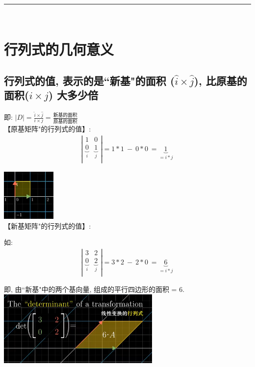 \documentclass[UTF8]{ctexart}
\begin{document}
	
~\\
\hrule
~\\

\section{行列式的几何意义}

\subsection{行列式的值, 表示的是``新基"的面积 ($ \hat{i} × \hat{j}$), 比原基的面积($ i × j$) 大多少倍}

即:
$
\boxed{
	|D| = \frac{ \hat{i} × \hat{j}}{ i × j}
	= \frac{\text{新基的面积}}{\text{原基的面积}}
}$\\


【原基矩阵"的行列式的值】: \\
\begin{align*}
\left| \begin{array}{c|c}
	1&		0\\
	\underset{i}{\underbrace{0}}&		\underset{j}{\underbrace{1}}\\
\end{array} \right|=1*1\ -\ 0*0\ =\underset{=i*j}{\underbrace{1}}\	
\end{align*}

\includegraphics[width=0.2\textwidth]{img/0043.png}\\


【新基矩阵"的行列式的值】: \\

\begin{myEnvSample}
如: 
\begin{align*}
	\left| \begin{array}{c|c}
		3&		2\\
		\underset{i}{\underbrace{0}}&		\underset{j}{\underbrace{2}}\\
	\end{array} \right|=3*2\ -\ 2*0\ =\underset{=i*j}{\underbrace{6}}\
\end{align*}

即, 由``新基"中的两个基向量, 组成的平行四边形的面积 = 6.\\

\includegraphics[width=0.6\textwidth]{img/0044.png}
\end{myEnvSample}
\end{document}
